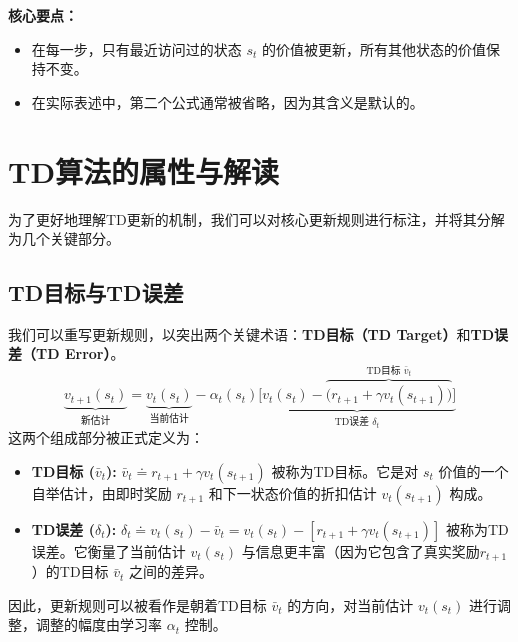 \documentclass[12pt, a4paper]{article}
\begin{document}
\textbf{核心要点：}
\begin{itemize}
    \item 在每一步，只有最近访问过的状态 $s_t$ 的价值被更新，所有其他状态的价值保持不变。
    \item 在实际表述中，第二个公式通常被省略，因为其含义是默认的。
\end{itemize}

\section{TD算法的属性与解读}
为了更好地理解TD更新的机制，我们可以对核心更新规则进行标注，并将其分解为几个关键部分。

\subsection{TD目标与TD误差}
我们可以重写更新规则，以突出两个关键术语：\textbf{TD目标（TD Target）}和\textbf{TD误差（TD Error）}。
\[
\underbrace{v_{t+1}(s_t)}_{\text{新估计}} = \underbrace{v_t(s_t)}_{\text{当前估计}} - \alpha_t(s_t) \underbrace{\Big[ v_t(s_t) - \overbrace{\big(r_{t+1} + \gamma v_t(s_{t+1})\big)}^{\text{TD目标 } \bar{v}_t} \Big]}_{\text{TD误差 } \delta_t}
\]
这两个组成部分被正式定义为：
\begin{itemize}
    \item \textbf{TD目标 ($\bar{v}_t$):} $\bar{v}_t \doteq r_{t+1} + \gamma v_t(s_{t+1})$ 被称为TD目标。它是对 $s_t$ 价值的一个自举估计，由即时奖励 $r_{t+1}$ 和下一状态价值的折扣估计 $v_t(s_{t+1})$ 构成。

    \item \textbf{TD误差 ($\delta_t$):} $\delta_t \doteq v_t(s_t) - \bar{v}_t = v_t(s_t) - [r_{t+1} + \gamma v_t(s_{t+1})]$ 被称为TD误差。它衡量了当前估计 $v_t(s_t)$ 与信息更丰富（因为它包含了真实奖励$r_{t+1}$）的TD目标 $\bar{v}_t$ 之间的差异。
\end{itemize}
因此，更新规则可以被看作是朝着TD目标 $\bar{v}_t$ 的方向，对当前估计 $v_t(s_t)$ 进行调整，调整的幅度由学习率 $\alpha_t$ 控制。
\end{document}
